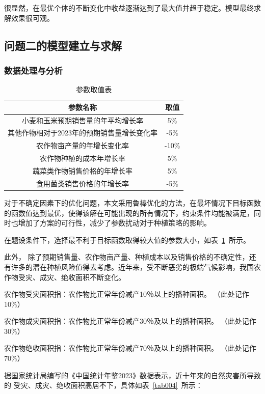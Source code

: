 \documentclass{cumcmthesis}
\begin{document}
很显然，在最优个体的不断变化中收益逐渐达到了最大值并趋于稳定。模型最终求解效果很可观。
\subsection{问题二的模型建立与求解}
\subsubsection{数据处理与分析}
\begin{table}[!htbp]
	\caption{参数取值表}\label{tab002} \centering
	\begin{tabular}{|c|c|} 
		\hline
		参数名称                    & 取值     \\ 
		\hline
		小麦和玉米预期销售量的年平均增长率       & 5\%    \\ 
		\hline
		其他作物相对于2023年的预期销售量增长变化率 & -5\%   \\ 
		\hline
		农作物亩产量的年增长变化率           & -10\%  \\ 
		\hline
		农作物种植的成本年增长率            & 5\%    \\ 
		\hline
		蔬菜类作物销售价格的年增长率          & 5\%    \\ 
		\hline
		食用菌类销售价格的年增长率           & -5\%   \\
		\hline
	\end{tabular}
\end{table}
对于不确定因素下的优化问题，本文采用鲁棒优化的方法，在最坏情况下目标函数的函数值达到最优，使得该解在可能出现的所有情况下，约束条件均能被满足，同时也增加了方案的可行性，减少了参数扰动对于种植策略的影响。

在题设条件下，选择最不利于目标函数取得较大值的参数大小，如表~\ref{tab002}~所示。

此外， 除了预期销售量、农作物亩产量、种植成本以及销售价格的不确定性，还有许多的潜在种植风险值得去考虑。近年来，受不断恶劣的极端气候影响，我国农作物受灾、成灾、绝收面积不断变化。

农作物受灾面积指：农作物比正常年份减产10％以上的播种面积。 （此处记作10\%）

农作物成灾面积指：农作物比正常年份减产30％及以上的播种面积。 （此处记作30\%）

农作物绝收面积指：农作物比正常年份减产70％及以上的播种面积。 （此处记作70\%）

据国家统计局编写的《中国统计年鉴2023》\cite{bib:one}数据表示，近十年来的自然灾害所导致的
受灾、成灾、绝收面积高居不下，具体如表~\ref{tab004}~所示：
\end{document}
